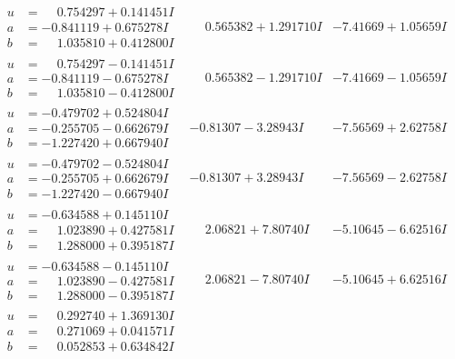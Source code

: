 \documentclass[1p]{elsarticle_modified}
\theoremstyle{definition}
\begin{document}
$$\begin{array}{c|c|c}
\begin{aligned}
u &= \phantom{-}0.754297 + 0.141451 I \\
a &= -0.841119 + 0.675278 I \\
b &= \phantom{-}1.035810 + 0.412800 I\end{aligned}
 & \phantom{-}0.565382 + 1.291710 I & -7.41669 + 1.05659 I \\ \hline\begin{aligned}
u &= \phantom{-}0.754297 - 0.141451 I \\
a &= -0.841119 - 0.675278 I \\
b &= \phantom{-}1.035810 - 0.412800 I\end{aligned}
 & \phantom{-}0.565382 - 1.291710 I & -7.41669 - 1.05659 I \\ \hline\begin{aligned}
u &= -0.479702 + 0.524804 I \\
a &= -0.255705 - 0.662679 I \\
b &= -1.227420 + 0.667940 I\end{aligned}
 & -0.81307 - 3.28943 I & -7.56569 + 2.62758 I \\ \hline\begin{aligned}
u &= -0.479702 - 0.524804 I \\
a &= -0.255705 + 0.662679 I \\
b &= -1.227420 - 0.667940 I\end{aligned}
 & -0.81307 + 3.28943 I & -7.56569 - 2.62758 I \\ \hline\begin{aligned}
u &= -0.634588 + 0.145110 I \\
a &= \phantom{-}1.023890 + 0.427581 I \\
b &= \phantom{-}1.288000 + 0.395187 I\end{aligned}
 & \phantom{-}2.06821 + 7.80740 I & -5.10645 - 6.62516 I \\ \hline\begin{aligned}
u &= -0.634588 - 0.145110 I \\
a &= \phantom{-}1.023890 - 0.427581 I \\
b &= \phantom{-}1.288000 - 0.395187 I\end{aligned}
 & \phantom{-}2.06821 - 7.80740 I & -5.10645 + 6.62516 I \\ \hline\begin{aligned}
u &= \phantom{-}0.292740 + 1.369130 I \\
a &= \phantom{-}0.271069 + 0.041571 I \\
b &= \phantom{-}0.052853 + 0.634842 I\end{aligned}

\end{array}$$
\end{document}
